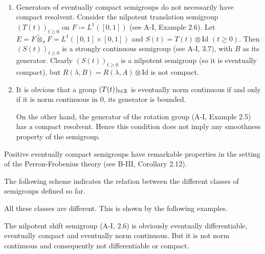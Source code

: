 \begin{remark}\label{rem:a2-1.26} ~
	\vspace{ -0.5\baselineskip}
\begin{enumerate}[\upshape (i), wide, labelsep=1em, itemsep=1ex]
\item \label{rem:a2-1.26.1}
Generators of eventually compact semigroups do not necessarily have compact resolvent.
Consider the nilpotent translation semigroup $(T(t))_{t\geq 0}$ on $F \coloneqq L^{1}([0,1])$ (see A-I, Example 2.6).
Let $E = F \widetilde{\otimes}_{\pi} F = L^{1}([0,1] \times [0,1])$ and $S(t) = T(t) \otimes \text{Id}$ $(t \geq 0)$.
Then $(S(t))_{t\geq 0}$ is a strongly continuous semigroup (see A-I, 3.7), 
with $B$ as its generator.
Clearly $(S(t))_{t\geq 0}$ is a nilpotent semigroup (so it is eventually compact), but $R(\lambda,B) = R(\lambda,A) \otimes \text{Id}$ is not compact.

\item \label{rem:a2-1.26.2}
It is obvious that a group $(T(t))_{t \in \mathbb{R}}$ is eventually norm continuous if and only if it is norm continuous in $0$, \ie its generator is bounded.

On the other hand, the generator of the rotation group (A-I, Example 2.5) 
has a compact resolvent.
Hence this condition does not imply any smoothness property of the semigroup.
\end{enumerate}
\end{remark}

Positive eventually compact semigroups have remarkable properties in the setting of the Perron-Frobenius theory (see \eg B-III, Corollary 2.12).

The following scheme indicates the relation between the different classes of semigroups defined so far.


All these classes are different.
This is shown by the following examples.

\begin{example}\label{ex:a2-1.27}
The nilpotent shift semigroup (A-I, 2.6) is obviously eventually differentiable, eventually compact and eventually norm continuous.
But it is not norm continuous and consequently not differentiable or compact.
\end{example}


